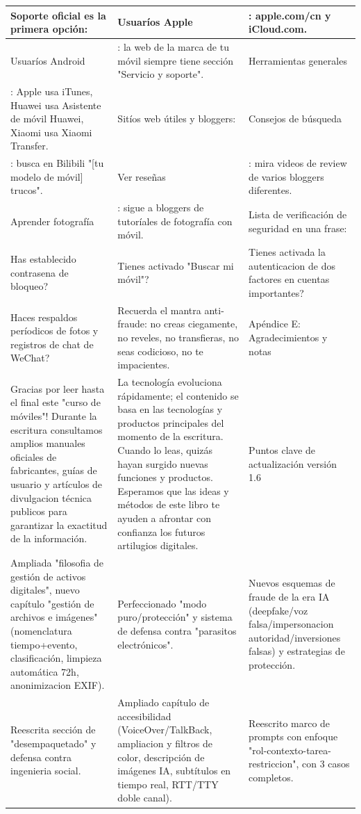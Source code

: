 
\begin{center}
\begin{tabularx}{\linewidth}{|X|X|X|}
\hline
\textbf{Soporte oficial es la primera opción:} & \textbf{Usuaríos Apple} & \textbf{: apple.com/cn y iCloud.com.} \tabularnewline
\hline
Usuaríos Android & : la web de la marca de tu móvil siempre tiene sección "Servicio y soporte". & Herramientas generales \tabularnewline
: Apple usa iTunes, Huawei usa Asistente de móvil Huawei, Xiaomi usa Xiaomi Transfer. & Sitíos web útiles y bloggers: & Consejos de búsqueda \tabularnewline
: busca en Bilibili "[tu modelo de móvil] trucos". & Ver reseñas & : mira videos de review de varios bloggers diferentes. \tabularnewline
Aprender fotografía & : sigue a bloggers de tutoríales de fotografía con móvil. & Lista de verificación de seguridad en una frase: \tabularnewline
Has establecido contrasena de bloqueo? & Tienes activado "Buscar mi móvil"? & Tienes activada la autenticacion de dos factores en cuentas importantes? \tabularnewline
Haces respaldos períodicos de fotos y registros de chat de WeChat? & Recuerda el mantra anti-fraude: no creas ciegamente, no reveles, no transfieras, no seas codicioso, no te impacientes. & Apéndice E: Agradecimientos y notas \tabularnewline
Gracias por leer hasta el final este "curso de móviles"! Durante la escritura consultamos amplios manuales oficiales de fabricantes, guías de usuario y artículos de divulgacion técnica publicos para garantizar la exactitud de la información. & La tecnología evoluciona rápidamente; el contenido se basa en las tecnologías y productos principales del momento de la escritura. Cuando lo leas, quizás hayan surgido nuevas funciones y productos. Esperamos que las ideas y métodos de este libro te ayuden a afrontar con confianza los futuros artilugios digitales. & Puntos clave de actualización versión 1.6 \tabularnewline
Ampliada "filosofia de gestión de activos digitales", nuevo capítulo "gestión de archivos e imágenes" (nomenclatura tiempo+evento, clasificación, limpieza automática 72h, anonimizacion EXIF). & Perfeccionado "modo puro/protección" y sistema de defensa contra "parasitos electrónicos". & Nuevos esquemas de fraude de la era IA (deepfake/voz falsa/impersonacion autoridad/inversiones falsas) y estrategias de protección. \tabularnewline
Reescrita sección de "desempaquetado" y defensa contra ingenieria social. & Ampliado capítulo de accesibilidad (VoiceOver/TalkBack, ampliacion y filtros de color, descripción de imágenes IA, subtítulos en tiempo real, RTT/TTY doble canal). & Reescrito marco de prompts con enfoque "rol-contexto-tarea-restriccion", con 3 casos completos. \tabularnewline

\end{tabularx}
\end{center}
